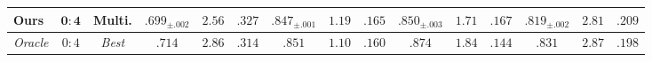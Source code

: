 \begin{table}[t]
\begin{tabular}{@{}lcc|ccc|ccc|ccc|ccc@{}}
\textbf{Ours} & $\mathbf{0{:}4}$ & \textbf{Multi.} & $\mathbf{.699}_{\pm.002}$ & $2.56$ & $\mathbf{.327}$ & $\mathbf{.847}_{\pm.001}$ & $1.19$ & $\mathbf{.165}$ & $\mathbf{.850}_{\pm.003}$ & $1.71$ & $\mathbf{.167}$ & $\mathbf{.819}_{\pm.002}$ & $2.81$ & $\mathbf{.209}$ \\
\midrule
\textit{Oracle} & $\mathit{0{:}4}$ & \textit{Best} & $.714$ & $2.86$ & $.314$ & $.851$ & $1.10$ & $.160$ & $.874$ & $1.84$ & $.144$ & $.831$ & $2.87$ & $.198$ \\
\bottomrule
\end{tabular}

\end{table}
